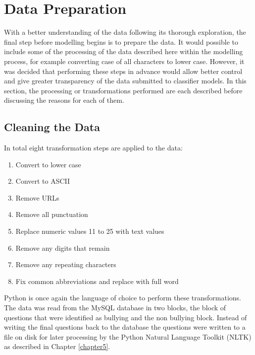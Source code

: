 \section{Data Preparation}
\label{section:data_prepatation}

With a better understanding of the data following its thorough exploration, the final step before modelling begins is to prepare the data. It would possible to include some of the processing of the data described here within the modelling process, for example converting case of all characters to lower case. However, it was decided that performing these steps in advance would allow better control and give greater transparency of the data submitted to classifier models. In this section, the processing or transformations performed are each described before discussing the reasons for each of them.

\subsection{Cleaning the Data}

In total eight transformation steps are applied to the data:

\begin{enumerate}
	\item Convert to lower case
	\item Convert to ASCII
	\item Remove URLs
	\item Remove all punctuation
	\item Replace numeric values 11 to 25 with text values
	\item Remove any digits that remain
	\item Remove any repeating characters
	\item Fix common abbreviations and replace with full word
\end{enumerate}

Python is once again the language of choice to perform these transformations. The data was read from the MySQL database in two blocks, the block of questions that were identified as bullying and the non bullying block. Instead of writing the final questions back to the database the questions were written to a file on disk for later processing by the Python Natural Language Toolkit (NLTK) \cite{bird_natural_2009} as described in Chapter \ref{chapter5}.

